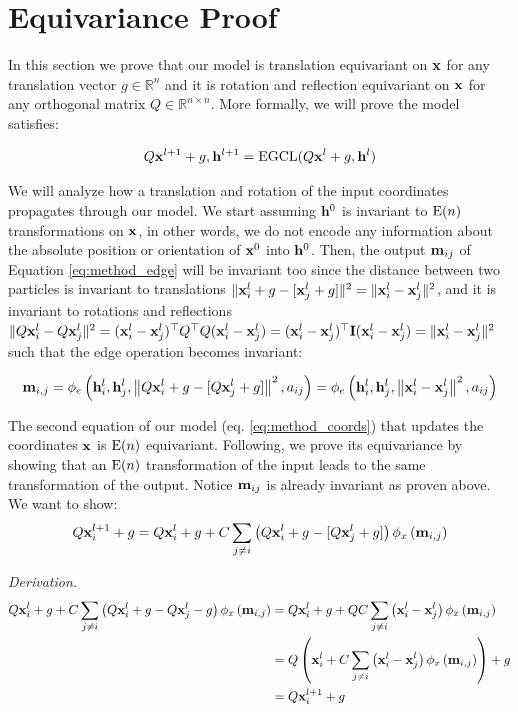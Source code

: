 \newpage
\appendix 
\section{Equivariance Proof} \label{sec:appendix_equiv_proof}

In this section we prove that our model is translation equivariant on $\mathbf{x}$ for any translation vector $g \in \mathbb{R}^n$ and it is rotation and reflection equivariant on $\mathbf{x}$ for any orthogonal matrix $Q \in \mathbb{R}^{n \times n}$. More formally, we will prove the model satisfies:

$$Q\mathbf{x}^{l+1} + g, \mathbf{h}^{l+1}  = \mathrm{EGCL}(Q\mathbf{x}^l + g, \mathbf{h}^l)$$

We will analyze how a translation and rotation of the input coordinates propagates through our model. We start assuming $\mathbf{h}^0$ is invariant to $\mathrm{E}(n)$ transformations on $\mathbf{x}$, in other words, we do not encode any information about the absolute position or orientation of $\mathbf{x}^0$ into $\mathbf{h}^0$. Then, the output $\mathbf{m}_{ij}$ of Equation \ref{eq:method_edge} will be invariant too since the distance between two particles is invariant to translations $\|\mathbf{x}_{i}^{l} +g - [\mathbf{x}_{j}^{l} + g]\|^{2} = \|\mathbf{x}_{i}^{l} -\mathbf{x}_{j}^{l}\|^{2}$, and it is invariant to rotations and reflections $\|Q\mathbf{x}_{i}^{l} - Q\mathbf{x}_{j}^{l}\|^{2} = (\mathbf{x}_i^l- \mathbf{x}_j^l)^\top Q^\top Q (\mathbf{x}_{i}^{l} -\mathbf{x}_{j}^{l}) = (\mathbf{x}_i^l- \mathbf{x}_j^l)^\top \mathbf{I} (\mathbf{x}_{i}^{l} -\mathbf{x}_{j}^{l}) = \|\mathbf{x}_{i}^{l} -\mathbf{x}_{j}^{l}\|^{2}$ such that the edge operation becomes invariant:

$$\mathbf{m}_{i, j} =\phi_{e}\left(\mathbf{h}_{i}^{l}, \mathbf{h}_{j}^{l},\left\|Q\mathbf{x}_{i}^{l} + g- [Q\mathbf{x}_{j}^{l} + g]\right\|^{2}, a_{i j}\right) = \phi_{e}\left(\mathbf{h}_{i}^{l}, \mathbf{h}_{j}^{l},\left\|\mathbf{x}_{i}^{l} - \mathbf{x}_{j}^{l} \right\|^{2}, a_{i j}\right)$$

The second equation of our model (eq. \ref{eq:method_coords}) that updates the coordinates $\mathbf{x}$ is $\mathrm{E}(n)$ equivariant. Following, we prove its equivariance by showing that an $\mathrm{E}(n)$ transformation of the input leads to the same transformation of the output. Notice $\mathbf{m}_{ij}$ is already invariant as proven above. We want to show:
$$Q\mathbf{x}_{i}^{l+1} + g  = Q\mathbf{x}_{i}^{l} + g +C\sum_{j \neq i}\left(Q\mathbf{x}_{i}^{l} + g - [Q\mathbf{x}_{j}^{l} + g]\right) \phi_{x}\left(\mathbf{m}_{i, j}\right)$$

\textit{Derivation.}
\begin{align*}
    Q\mathbf{x}_{i}^{l} + g +C\sum_{j \neq i}\left(Q\mathbf{x}_{i}^{l} + g - Q\mathbf{x}_{j}^{l} - g\right) \phi_{x}\left(\mathbf{m}_{i, j}\right)
    &= Q\mathbf{x}_{i}^{l} + g +QC\sum_{j \neq i}\left(\mathbf{x}_{i}^{l} - \mathbf{x}_{j}^{l}\right) \phi_{x}\left(\mathbf{m}_{i, j}\right)\\
    &= Q\left(\mathbf{x}_{i}^{l} +C\sum_{j \neq i}\left(\mathbf{x}_{i}^{l} - \mathbf{x}_{j}^{l}\right) \phi_{x}\left(\mathbf{m}_{i, j}\right) \right) + g\\
    &= Q\mathbf{x}_{i}^{l+1} + g
\end{align*}

